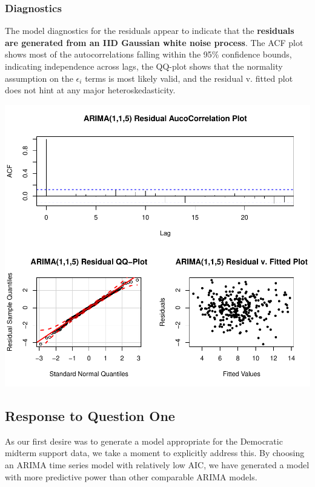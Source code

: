 \documentclass[]{article}
\begin{document}
\subsubsection{Diagnostics}\label{diagnostics}

The model diagnostics for the residuals appear to indicate that the
\textbf{residuals are generated from an IID Gaussian white noise
process}. The ACF plot shows most of the autocorrelations falling within
the 95\% confidence bounds, indicating independence across lags, the
QQ-plot shows that the normality assumption on the \(\epsilon_i\) terms
is most likely valid, and the residual v. fitted plot does not hint at
any major heteroskedasticity.

\begin{center}\includegraphics{midterm_project_final_files/figure-latex/diagnostics-1} \end{center}

\subsection{Response to Question One}\label{response-to-question-one}

As our first desire was to generate a model appropriate for the
Democratic midterm support data, we take a moment to explicitly address
this. By choosing an ARIMA time series model with relatively low AIC, we
have generated a model with more predictive power than other comparable
ARIMA models.
\end{document}
